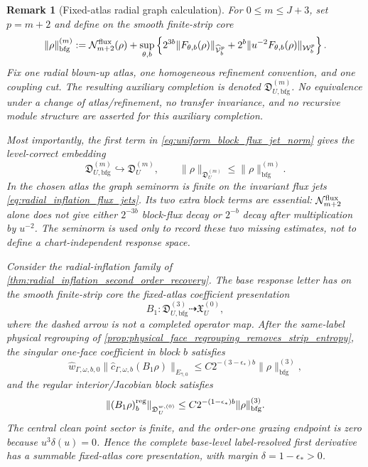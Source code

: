 \documentclass[11pt]{amsart}
\theoremstyle{compactplain}
\theoremstyle{compactdefinition}
\theoremstyle{compactremark}
\newtheorem*{remark*}{Remark}
\begin{document}
\begin{remark*}[Fixed-atlas radial graph calculation]
For \(0\le m\le J+3\), set \(p=m+2\) and define on the smooth finite-strip
core
\begin{equation}
\label{eq:uniform_block_flux_jet_norm}
 \|\rho\|_{\mathrm{bfg}}^{(m)}
 :=\mathcal N_{m+2}^{\rm flux}(\rho)
 +\sup_{\theta,b}\left\{
 2^{3b}\|F_{\theta,b}(\rho)\|_{\widehat{\mathcal V}_b^p}
 +2^b\|u^{-2}F_{\theta,b}(\rho)\|_{\mathcal W_b^p}
 \right\}.
\end{equation}
Fix one radial blown-up atlas, one homogeneous refinement convention, and one
coupling cut.  The resulting auxiliary completion is denoted
\(\mathfrak D_{U,\mathrm{bfg}}^{(m)}\).  No equivalence under a change of
atlas/refinement, no transfer invariance, and no recursive module structure
are asserted for this auxiliary completion.

Most importantly, the first term in
\eqref{eq:uniform_block_flux_jet_norm} gives the level-correct embedding
\begin{equation}
\label{eq:block_flux_correct_level_embedding}
 \mathfrak D_{U,\mathrm{bfg}}^{(m)}\hookrightarrow
 \mathfrak D_U^{(m)},\qquad
 \|\rho\|_{\mathfrak D_U^{(m)}}\le
 \|\rho\|_{\mathrm{bfg}}^{(m)}.
\end{equation}
In the chosen atlas the graph seminorm is finite on the invariant flux jets
\eqref{eq:radial_inflation_flux_jets}.  Its two extra block terms are
essential: \(\mathcal N_{m+2}^{\rm flux}\) alone does not give either
\(2^{-3b}\) block-flux decay or \(2^{-b}\) decay after multiplication by
\(u^{-2}\).  The seminorm is used only to record these two missing estimates,
not to define a chart-independent response space.

Consider the radial-inflation family of
\cref{thm:radial_inflation_second_order_recovery}.  The base response letter
has on the smooth finite-strip core the fixed-atlas coefficient presentation
\[
 B_1:\mathfrak D_{U,\mathrm{bfg}}^{(3)}
 \dashrightarrow\mathfrak X_U^{(0)},
\]
where the dashed arrow is not a completed operator map.
After the same-label physical regrouping of
\cref{prop:physical_face_regrouping_removes_strip_entropy}, the singular
one-face coefficient in block \(b\) satisfies
\begin{equation}
\label{eq:first_order_radial_grouped_coefficient}
 \widehat w_{\Gamma,\omega,b,0}
 \|\widehat c_{\Gamma,\omega,b}(B_1\rho)\|_{E_{\widehat\gamma,0}}
 \le C2^{-(3-\epsilon_*)b}
 \|\rho\|_{\mathrm{bfg}}^{(3)},
\end{equation}
and the regular interior/Jacobian block satisfies
\begin{equation}
\label{eq:first_order_radial_regular_block_coefficient}
 \|(B_1\rho)^{\rm reg}_b\|_{\mathfrak D_U^{w,(0)}}
 \le C2^{-(1-\epsilon_*)b}\|\rho\|_{\mathrm{bfg}}^{(3)}.
\end{equation}
The central clean point sector is finite, and the order-one grazing endpoint
is zero because \(u^3\delta(u)=0\).  Hence the complete base-level
label-resolved first derivative has a summable fixed-atlas core presentation,
with margin \(\delta=1-\epsilon_*>0\).


\end{remark*}
\end{document}
